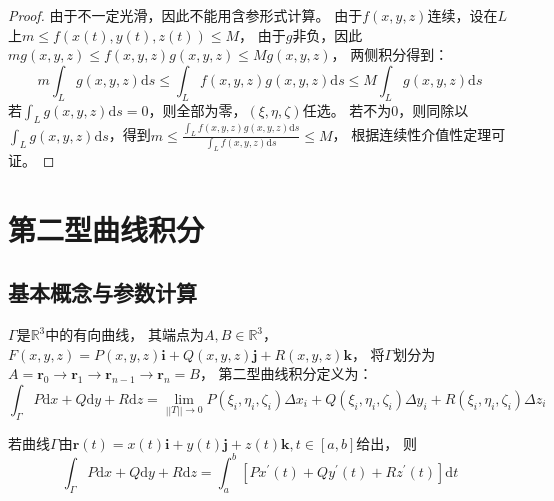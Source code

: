 \begin{proof}
  由于不一定光滑，因此不能用含参形式计算。
  由于$f(x,y,z)$连续，设在$L$上$m \leq f(x(t),y(t),z(t)) \leq M$，
  由于$g$非负，因此$m g(x,y,z) \leq f(x,y,z) g(x,y,z) \leq M g(x,y,z)$，
  两侧积分得到：
  \begin{equation*}
    m \int_L g(x,y,z) \mathrm{d} s \leq \int_L f(x,y,z) g(x,y,z ) \mathrm{d} s \leq M \int_L g(x,y,z) \mathrm{d} s
  \end{equation*}
  若$\int_Lg(x,y,z) \mathrm{d} s = 0$，则全部为零，$(\xi,\eta,\zeta)$任选。
  若不为$0$，则同除以$\int_Lg(x,y,z)\mathrm{d} s$，得到$m \leq \frac{\int_Lf(x,y,z)g(x,y,z)\mathrm{d} s}{\int_L f(x,y,z)\mathrm{d} s} \leq M$，
  根据连续性介值性定理可证。
\end{proof}

\section{第二型曲线积分}

\subsection{基本概念与参数计算}

\begin{definition}[第二型曲线积分]
  $\Gamma$是$\mathbb{R}^3$中的有向曲线，
  其端点为$A,B \in \mathbb{R}^3$，
  $F(x,y,z) = P(x,y,z)\mathbf{i} + Q(x,y,z)\mathbf{j} + R(x,y,z)\mathbf{k}$，
  将$\Gamma$划分为$A = \mathbf{r}_0 \rightarrow \mathbf{r}_1 \rightarrow \mathbf{r}_{n-1} \rightarrow \mathbf{r}_n = B$，
  第二型曲线积分定义为：
  \begin{equation*}
    \int _{\Gamma}P\mathrm{d}x + Q\mathrm{d}y + R\mathrm{d}z = \lim \limits _{||T|| \rightarrow 0}P(\xi_i,\eta_i,\zeta_i)\Delta x_i + Q(\xi_i,\eta_i,\zeta_i)\Delta y_i + R(\xi_i,\eta_i,\zeta_i) \Delta z_i
  \end{equation*}
\end{definition}


\begin{theorem}[第二型曲线积分的计算]
  若曲线$\Gamma$由$\mathbf{r}(t) = x(t) \mathbf{i} + y(t) \mathbf{j} + z(t) \mathbf{k}, t \in [a,b]$给出，
  则
  \begin{equation*}
    \int _{\Gamma}P \mathrm{d}x + Q \mathrm{d}y + R \mathrm{d}z = \int ^b_a [P x^{\prime}(t) + Q y^{\prime}(t) + R z^{\prime}(t)]\mathrm{d}t
  \end{equation*}
\end{theorem}

